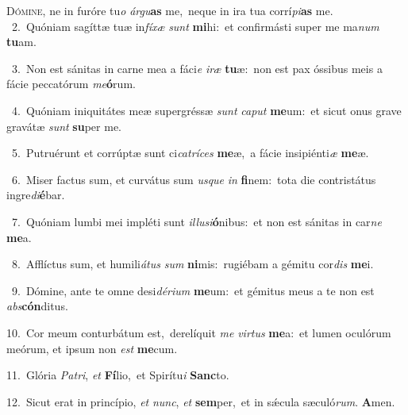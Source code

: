 \lettrine{\initial\textcolor{\initialcolor}{D}}{ómine,} ne in furóre tu\textit{o} \textit{ár}\-\textit{gu}\textbf{as} me,~\star neque in ira tua corrí\-\textit{pi}\-\textbf{as} me.\\
{\numbfont\textcolor{\numbcolor}{~2.}}~Quóniam sagíttæ tuæ in\-\textit{fí}\-\textit{xæ} \textit{sunt} \textbf{mi}\-hi:~\star et confirmásti super me ma\textit{num} \textbf{tu}\-am.\par
{\numbfont\textcolor{\numbcolor}{~3.}}~Non est sánitas in carne mea a fáci\textit{e} \textit{i}\-\textit{ræ} \textbf{tu}\-æ:~\star non est pax óssibus meis a fácie peccatórum \textit{me}\-\textbf{ó}rum.\par
{\numbfont\textcolor{\numbcolor}{~4.}}~Quóniam iniquitátes meæ supergréssæ \textit{sunt} \textit{ca}\-\textit{put} \textbf{me}\-um:~\star et sicut onus grave gravátæ \textit{sunt} \textbf{su}\-per me.\par
{\numbfont\textcolor{\numbcolor}{~5.}}~Putruérunt et corrúptæ sunt ci\-\textit{ca}\-\textit{trí}\textit{ces} \textbf{me}\-æ,~\star a fácie insipiénti\textit{æ} \textbf{me}\-æ.\par
{\numbfont\textcolor{\numbcolor}{~6.}}~Miser factus sum, et curvátus sum \textit{us}\-\textit{que} \textit{in} \textbf{fi}\-nem:~\star tota die contristátus ingre\-\textit{di}\-\textbf{é}bar.\par
{\numbfont\textcolor{\numbcolor}{~7.}}~Quóniam lumbi mei impléti sunt \textit{il}\-\textit{lu}\textit{si}\textbf{ó}nibus:~\star et non est sánitas in car\textit{ne} \textbf{me}\-a.\par
{\numbfont\textcolor{\numbcolor}{~8.}}~Afflíctus sum, et humili\-\textit{á}\-\textit{tus} \textit{sum} \textbf{ni}\-mis:~\star rugiébam a gémitu cor\textit{dis} \textbf{me}\-i.\par
{\numbfont\textcolor{\numbcolor}{~9.}}~Dómine, ante te omne desi\-\textit{dé}\-\textit{ri}\textit{um} \textbf{me}\-um:~\star et gémitus meus a te non est \textit{abs}\-\textbf{cón}ditus.\par
{\numbfont\textcolor{\numbcolor}{10.}}~Cor meum conturbátum est,~\dagger derelíquit \textit{me} \textit{vir}\-\textit{tus} \textbf{me}\-a:~\star et lumen oculórum meórum, et ipsum non \textit{est} \textbf{me}\-cum.\par
{\numbfont\textcolor{\numbcolor}{11.}}~Glória \textit{Pa}\-\textit{tri}, \textit{et} \textbf{Fí}\-lio,~\star et Spirítu\textit{i} \textbf{Sanc}\-to.\par
{\numbfont\textcolor{\numbcolor}{12.}}~Sicut erat in princípio, \textit{et} \textit{nunc}\-, \textit{et} \textbf{sem}\-per,~\star et in sǽcula sæculó\-\textit{rum}\-. \textbf{A}\-men.\par
